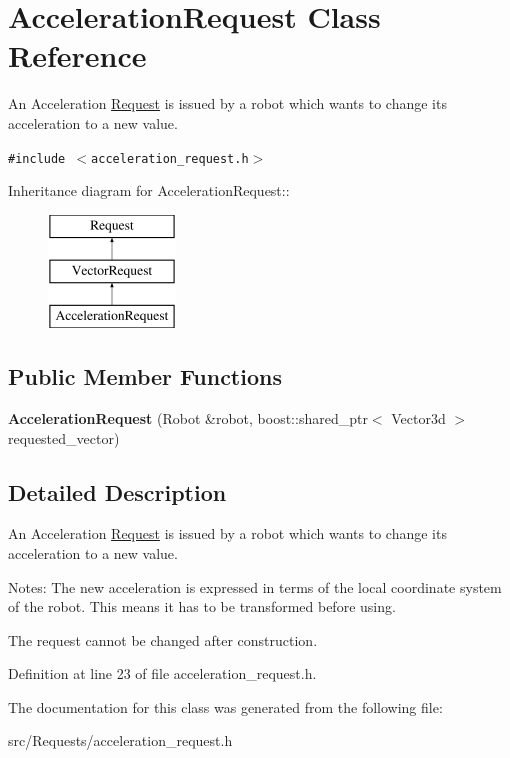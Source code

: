\hypertarget{class_acceleration_request}{
\section{AccelerationRequest Class Reference}
\label{class_acceleration_request}
}
An Acceleration \hyperlink{class_request}{Request} is issued by a robot which wants to change its acceleration to a new value.  


{\tt \#include $<$acceleration\_\-request.h$>$}

Inheritance diagram for AccelerationRequest::\begin{figure}[H]
\begin{center}
\leavevmode
\includegraphics[height=3cm]{class_acceleration_request}
\end{center}
\end{figure}
\subsection*{Public Member Functions}
\begin{CompactItemize}
\item 
\hypertarget{class_acceleration_request_93be16a9111ca256f24919bcfc8a8539}{
\textbf{AccelerationRequest} (Robot \&robot, boost::shared\_\-ptr$<$ Vector3d $>$ requested\_\-vector)}
\label{class_acceleration_request_93be16a9111ca256f24919bcfc8a8539}

\end{CompactItemize}


\subsection{Detailed Description}
An Acceleration \hyperlink{class_request}{Request} is issued by a robot which wants to change its acceleration to a new value. 

Notes: The new acceleration is expressed in terms of the local coordinate system of the robot. This means it has to be transformed before using.

The request cannot be changed after construction. 

Definition at line 23 of file acceleration\_\-request.h.

The documentation for this class was generated from the following file:\begin{CompactItemize}
\item 
src/Requests/acceleration\_\-request.h\end{CompactItemize}
